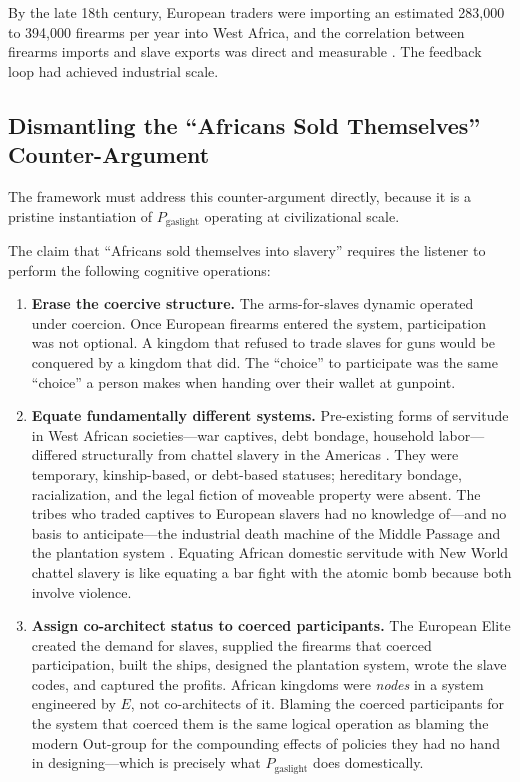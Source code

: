 By the late 18th century, European traders were importing an estimated 283,000 to 394,000 firearms per year into West Africa, and the correlation between firearms imports and slave exports was direct and measurable \cite{inikori}. The feedback loop had achieved industrial scale.

\subsection{Dismantling the ``Africans Sold Themselves'' Counter-Argument}

The framework must address this counter-argument directly, because it is a pristine instantiation of $P_{\text{gaslight}}$ operating at civilizational scale.

The claim that ``Africans sold themselves into slavery'' requires the listener to perform the following cognitive operations:

\begin{enumerate}
    \item \textbf{Erase the coercive structure.} The arms-for-slaves dynamic operated under coercion. Once European firearms entered the system, participation was not optional. A kingdom that refused to trade slaves for guns would be conquered by a kingdom that did. The ``choice'' to participate was the same ``choice'' a person makes when handing over their wallet at gunpoint.

    \item \textbf{Equate fundamentally different systems.} Pre-existing forms of servitude in West African societies---war captives, debt bondage, household labor---differed structurally from chattel slavery in the Americas \cite{lovejoy2012}. They were temporary, kinship-based, or debt-based statuses; hereditary bondage, racialization, and the legal fiction of moveable property were absent. The tribes who traded captives to European slavers had no knowledge of---and no basis to anticipate---the industrial death machine of the Middle Passage and the plantation system \cite{smallwood}. Equating African domestic servitude with New World chattel slavery is like equating a bar fight with the atomic bomb because both involve violence.

    \item \textbf{Assign co-architect status to coerced participants.} The European Elite created the demand for slaves, supplied the firearms that coerced participation, built the ships, designed the plantation system, wrote the slave codes, and captured the profits. African kingdoms were \textit{nodes} in a system engineered by $E$, not co-architects of it. Blaming the coerced participants for the system that coerced them is the same logical operation as blaming the modern Out-group for the compounding effects of policies they had no hand in designing---which is precisely what $P_{\text{gaslight}}$ does domestically.
\end{enumerate}

